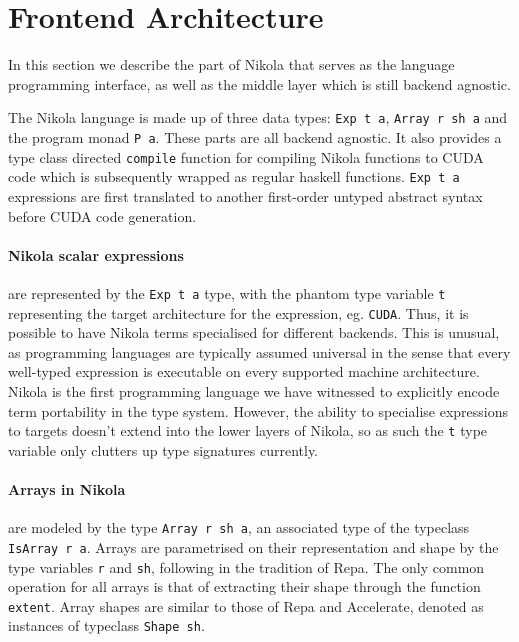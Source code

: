 \section{Frontend Architecture}

In this section we describe the part of Nikola that serves as the language
programming interface, as well as the middle layer which is still backend
agnostic.

The Nikola language is made up of three data types: \lstinline{Exp t a},
\lstinline{Array r sh a} and the program monad \lstinline{P a}. These parts are all
backend agnostic. It also provides a type class directed \lstinline{compile}
function for compiling Nikola functions to CUDA code which is subsequently
wrapped as regular haskell functions. \lstinline{Exp t a} expressions are first
translated to another first-order untyped abstract syntax before CUDA code
generation.

\paragraph{Nikola scalar expressions} are represented by the \lstinline{Exp t a} type, with
the phantom type variable \lstinline{t} representing the target architecture for
the expression, eg.  \lstinline{CUDA}. Thus, it is possible to have Nikola terms
specialised for different backends. This is unusual, as programming languages
are typically assumed universal in the sense that every well-typed expression
is executable on every supported machine architecture. Nikola is the first
programming language we have witnessed to explicitly encode term portability in
the type system. However, the ability to specialise expressions to targets
doesn't extend into the lower layers of Nikola, so as such the \lstinline{t} type
variable only clutters up type signatures currently.

\paragraph{Arrays in Nikola} are modeled by the type \lstinline{Array r sh a}, an associated
type of the typeclass \lstinline{IsArray r a}. Arrays are parametrised on their
representation and shape by the type variables \lstinline{r} and \lstinline{sh},
following in the tradition of Repa. The only common operation for all arrays is
that of extracting their shape through the function \lstinline{extent}. Array
shapes are similar to those of Repa and Accelerate, denoted as instances of
typeclass \lstinline{Shape sh}.

